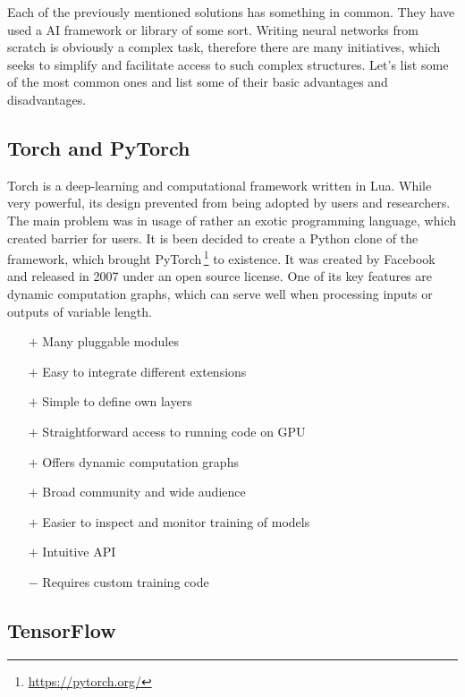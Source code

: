 Each of the previously mentioned solutions has something in common. They have used a AI framework or library of some sort. Writing neural networks from scratch is obviously a complex task, therefore there are many initiatives, which seeks to simplify and facilitate access to such complex structures. Let's list some of the most common ones and list some of their basic advantages and disadvantages.

\subsection{Torch and PyTorch}

Torch is a deep-learning and computational framework written in Lua. While very powerful, its design prevented from being adopted by users and researchers. The main problem was in usage of rather an exotic programming language, which created barrier for users. It is been decided to create a Python clone of the framework, which brought PyTorch\,\footnote{\url{https://pytorch.org/}} to existence. It was created by Facebook and released in 2007 under an open source license. One of its key features are dynamic computation graphs, which can serve well when processing inputs or outputs of variable length.

\begin{itemize}
    \item[$\boldsymbol{+}$] Many pluggable modules
    \item[$\boldsymbol{+}$] Easy to integrate different extensions
    \item[$\boldsymbol{+}$] Simple to define own layers
    \item[$\boldsymbol{+}$] Straightforward access to running code on GPU
    \item[$\boldsymbol{+}$] Offers dynamic computation graphs
    \item[$\boldsymbol{+}$] Broad community and wide audience
    \item[$\boldsymbol{+}$] Easier to inspect and monitor training of models
    \item[$\boldsymbol{+}$] Intuitive API
    \item[$\boldsymbol{-}$] Requires custom training code
\end{itemize}

\subsection{TensorFlow}

